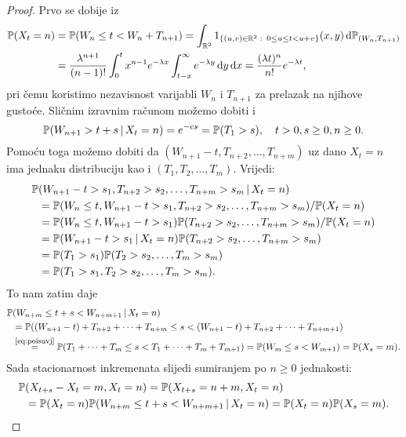 \documentclass[main.tex]{subfiles}
\begin{document}
\begin{proof}
	Prvo se dobije iz
	\begin{align}
		\mathbb{P}(X_t = n) & = \mathbb{P}(W_n \le t < W_n + T_{n+1}) =
		\int_{\mathbb{R}^2} 1_{\left\{ (u, v) \in \mathbb{R}^2 \, \colon \, 0 \le u \le t < u+v \right\}}(x,y) \,\mathrm d \mathbb{P}_{(W_n, T_{n+1})} \\ &= \frac{\lambda^{n+1}}{(n-1)!} \int_0^t x^{n-1}e^{-\lambda x} \int_{t-x}^\infty e^{-\lambda y} \,\mathrm d y \,\mathrm d x
		= \frac{(\lambda t)^n}{n!}e^{-\lambda t},
	\end{align}
	pri čemu koristimo nezavisnost varijabli \( W_n \) i \( T_{n+1} \) za prelazak na njihove gustoće. Sličnim izravnim računom možemo dobiti i
	\begin{equation} \label{eq:poiswnuzxt}
		\mathbb{P}(W_{n+1} > t + s \, \vert \, X_t = n) = e^{-cs} = \mathbb{P}(T_1 > s), \quad t > 0, s \ge 0, n \ge 0.
	\end{equation}
	Pomoću toga možemo dobiti da \( (W_{n+1} - t, T_{n+2}, \ldots, T_{n+m}) \) uz dano \( X_t = n \)
	ima jednaku distribuciju kao i \( (T_1, T_2, \ldots, T_m) \). Vrijedi:
	\begin{align}
		\mathbb{P} & (W_{n+1} -t > s_1 , T_{n+2} > s_2, \ldots, T_{n+m} > s_m \, \vert \, X_t = n)         \\
		   & =\mathbb{P}(W_n \le t, W_{n+1} -t > s_1, T_{n+2} > s_2, \ldots, T_{n+m} > s_m)/\mathbb{P}(X_t=n) \\
		   & =\mathbb{P}(W_n \le t, W_{n+1} -t > s_1)\mathbb{P}(T_{n+2}>s_2,\ldots,T_{n+m}>s_m)/\mathbb{P}(X_t=n)     \\
		   & =\mathbb{P}(W_{n+1} -t>s_1 \, \vert \, X_t = n)\mathbb{P}(T_{n+2}>s_2,\ldots,T_{n+m}>s_m)             \\
		   & =\mathbb{P}(T_1>s_1)\mathbb{P}(T_2>s_2,\ldots,T_m>s_m)                                           \\
		   & =\mathbb{P}(T_1>s_1,T_2>s_2,\ldots,T_m>s_m). \label{eq:poisuvj}
	\end{align}
	To nam zatim daje
	\begin{equation}
		\begin{aligned} \label{eq:poislema}
			\mathbb{P} & (W_{n+m} \le t+s < W_{n+m+1} \, \vert \, X_t = n)                                                   \\
			   & =\mathbb{P}((W_{n+1}-t)+T_{n+2} + \cdots + T_{n+m} \le s < (W_{n+1}-t) + T_{n+2} + \cdots + T_{n+m+1}) \\
			   & \overset{\footnotesize\eqref{eq:poisuvj}}= \mathbb{P}(T_1+\cdots+T_m \le s < T_1+\cdots+T_m+T_{m+1})
			= \mathbb{P}(W_m \le s < W_{m+1}) = \mathbb{P}(X_s=m).
		\end{aligned}
	\end{equation}
	Sada stacionarnost inkremenata slijedi sumiranjem po \( n \ge 0 \) jednakosti:
	\begin{equation}
		\begin{aligned}
			\mathbb{P} & (X_{t+s}-X_t =  m, X_t=n) = \mathbb{P}(X_{t+s}=n+m, X_t=n)                              \\
			   & = \mathbb{P}(X_t=n)\mathbb{P}(W_{n+m} \le t+s < W_{n+m+1} \, \vert \, X_t = n) = \mathbb{P}(X_t=n)\mathbb{P}(X_s=m).
		\end{aligned}
	\end{equation}
	

\end{proof}
\end{document}
